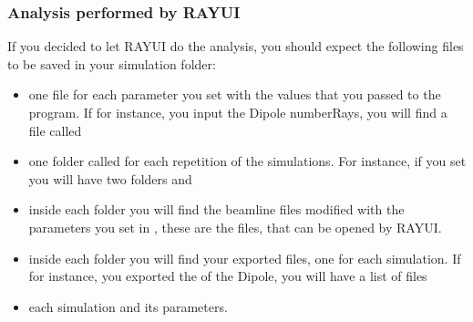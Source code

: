\documentclass[letterpaper,10pt,english]{sphinxmanual}
\begin{document}
\subsubsection{Analysis performed by RAY\sphinxhyphen{}UI}
\label{\detokenize{tutorial:analysis-performed-by-ray-ui}}
\sphinxAtStartPar
If you decided to let RAY\sphinxhyphen{}UI do the analysis, you should expect the following files to be
saved in your simulation folder:
\begin{itemize}
\item {} 
\sphinxAtStartPar
one file for each parameter you set with the values that you passed to the program.
If for instance, you input the Dipole numberRays, you will find a file called

\item {} 
\sphinxAtStartPar
one folder called  for each repetition of the simulations.
For instance, if you set  you will have two folders  and 

\item {} 
\sphinxAtStartPar
inside each  folder you will find the beamline files modified
with the parameters you set in , these are the  files,
that can be opened by RAY\sphinxhyphen{}UI.

\item {} 
\sphinxAtStartPar
inside each  folder you will find your exported files, one for
each simulation. If for instance, you exported the  of the Dipole,
you will have a list of files 

\item {} 
\sphinxAtStartPar
{} each simulation and its parameters.

\end{itemize}
\end{document}
